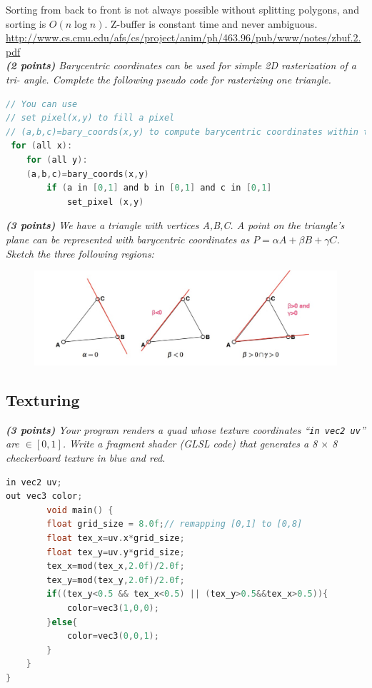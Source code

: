 \documentclass[a4paper,10pt]{article}
\begin{document}
Sorting from back to front is not always possible without splitting polygons, and sorting is  $O(n \log n)$. Z-buffer is constant time and never ambiguous.\\

\url{http://www.cs.cmu.edu/afs/cs/project/anim/ph/463.96/pub/www/notes/zbuf.2.pdf}\\

\textit{\textbf{(2 points)} Barycentric coordinates can be used for simple 2D rasterization of a tri-
angle. Complete the following pseudo code for rasterizing one triangle.}\\
\begin{lstlisting}[language=C]
// You can use
// set pixel(x,y) to fill a pixel
// (a,b,c)=bary_coords(x,y) to compute barycentric coordinates within the triangle
 for (all x): 
 	for (all y):
 	(a,b,c)=bary_coords(x,y)
		if (a in [0,1] and b in [0,1] and c in [0,1]
			set_pixel (x,y)
\end{lstlisting}

\textit{\textbf{(3 points)} We have a triangle with vertices A,B,C. A point on the triangle’s plane can be represented with barycentric coordinates as $P = \alpha A + \beta B + \gamma C$. Sketch the three following regions:}
\begin{figure}[H]
	\centering
	\includegraphics[width=.7\textwidth]{3-textures}
\end{figure}
\subsection{Texturing}
\textit{\textbf{(3 points)} Your program renders a quad whose texture coordinates ``\lstinline|in vec2 uv|'' are $\in [0, 1]$. Write a fragment shader (GLSL code) that generates a 8 $\times$ 8 checkerboard texture in blue and red.}\\
\begin{lstlisting}[language=C]
in vec2 uv;
out vec3 color;
		void main() {
		float grid_size = 8.0f;// remapping [0,1] to [0,8]
		float tex_x=uv.x*grid_size;
		float tex_y=uv.y*grid_size;
		tex_x=mod(tex_x,2.0f)/2.0f;
		tex_y=mod(tex_y,2.0f)/2.0f;
		if((tex_y<0.5 && tex_x<0.5) || (tex_y>0.5&&tex_x>0.5)){
			color=vec3(1,0,0);
		}else{
			color=vec3(0,0,1);
		}
	}
}
\end{lstlisting}
\end{document}
